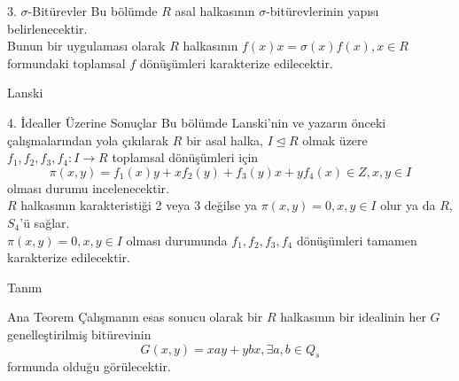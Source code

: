 \documentclass{beamer}
\begin{document}
\begin{frame}

\begin{block}{3. $\sigma$-Bitürevler}
Bu bölümde $R$ asal halkasının $\sigma$-bitürevlerinin yapısı belirlenecektir.\\
Bunun bir uygulaması olarak $R$ halkasının $f(x)x = \sigma(x)f(x), x \in R$ formundaki toplamsal $f$ dönüşümleri karakterize edilecektir.
\end{block}
    
\end{frame}

\begin{frame}

\begin{block}{Lanski}

\end{block}

\end{frame}

\begin{frame}
\footnotesize

\begin{block}{4. İdealler Üzerine Sonuçlar}
Bu bölümde Lanski'nin ve yazarın önceki çalışmalarından yola çıkılarak $R$ bir asal halka, $I \trianglelefteq R$ olmak üzere $f_1, f_2, f_3, f_4 \colon I \to R$ toplamsal dönüşümleri için
\begin{equation*}
    \pi(x,y) = f_1(x)y + xf_2(y) + f_3(y)x + yf_4(x) \in Z, x, y \in I
\end{equation*}
olması durumu incelenecektir.\\
$R$ halkasının karakteristiği 2 veya 3 değilse ya $\pi(x,y) = 0, x, y \in I$ olur ya da $R$, $S_4$'ü sağlar.\\
$\pi(x,y) = 0, x, y \in I$ olması durumunda $f_1, f_2, f_3, f_4$ dönüşümleri tamamen karakterize edilecektir.\\
\end{block}

\end{frame}

\begin{frame}

\begin{block}{Tanım}

\end{block}

\end{frame}

\begin{frame}

\begin{block}{Ana Teorem}
Çalışmanın esas sonucu olarak bir $R$ halkasının bir idealinin her $G$ genelleştirilmiş bitürevinin
\begin{equation*}
    G(x,y) = xay + ybx, \exists a, b \in Q_s
\end{equation*}
formunda olduğu görülecektir.
\end{block}

\end{frame}
\end{document}
